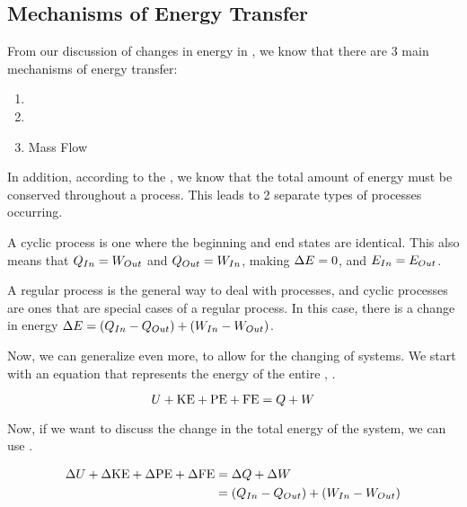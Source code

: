 \subsection{Mechanisms of Energy Transfer}\label{subsec:Mechanisms_Energy_Transfer}
From our discussion of changes in energy in , we know that there are 3 main mechanisms of energy transfer:
\begin{enumerate}[noitemsep]
\item {}
\item {}
\item Mass Flow
\end{enumerate}

In addition, according to the , we know that the total amount of energy must be conserved throughout a process.
This leads to 2 separate types of processes occurring.
\begin{description}[noitemsep]
\item[Cyclical] A cyclic process is one where the beginning and end states are identical.
  This also means that $Q_{In} = W_{Out}$ and $Q_{Out} = W_{In}$, making $\Delta E = 0$, and $E_{In} = E_{Out}$.
\item[Regular] A regular process is the general way to deal with processes, and cyclic processes are ones that are special cases of a regular process.
  In this case, there is a change in energy $\Delta E = (Q_{In} - Q_{Out}) + (W_{In} - W_{Out})$.
\end{description}

Now, we can generalize  even more, to allow for the changing of systems.
We start with an equation that represents the energy of the entire , .

\begin{equation}\label{eq:System_Energy}
  U + \mathrm{KE} + \mathrm{PE} + \mathrm{FE} = Q + W
\end{equation}

Now, if we want to discuss the change in the total energy of the system, we can use .

\begin{equation}\label{eq:Change_System_Energy}
  \begin{aligned}
    \Delta U + \Delta \mathrm{KE} + \Delta \mathrm{PE} + \Delta \mathrm{FE} &= \Delta Q + \Delta W \\
    &= (Q_{In} - Q_{Out}) + (W_{In} - W_{Out})
  \end{aligned}
\end{equation}


